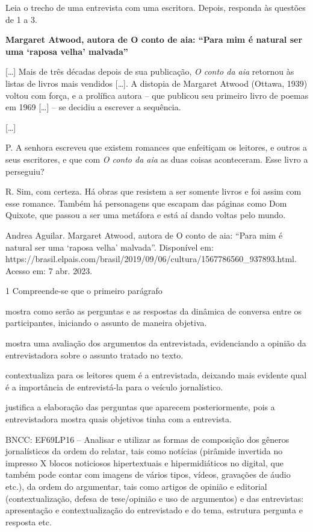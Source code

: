\begin{escolha}
\begin{escolha}
\begin{escolha}
\begin{escolha}
\begin{escolha}
Leia o trecho de uma entrevista com uma escritora. Depois, responda às
questões de 1 a 3.

\textbf{Margaret Atwood, autora de O conto de aia: ``Para mim é natural
ser uma `raposa velha' malvada''}

{[}\ldots{}{]} Mais de três décadas depois de sua publicação, \emph{O
conto da aia} retornou às listas de livros mais vendidos {[}\ldots{}{]}.
A distopia de Margaret Atwood (Ottawa, 1939) voltou com força, e a
prolífica autora -- que publicou seu primeiro livro de poemas em 1969
{[}\ldots{}{]} -- se decidiu a escrever a sequência.

{[}\ldots{}{]}

P. A senhora escreveu que existem romances que enfeitiçam os leitores, e
outros a seus escritores, e que com \emph{O conto da aia} as duas coisas
aconteceram. Esse livro a perseguiu?

R. Sim, com certeza. Há obras que resistem a ser somente livros e foi
assim com esse romance. Também há personagens que escapam das páginas
como Dom Quixote, que passou a ser uma metáfora e está aí dando voltas
pelo mundo.

Andrea Aguilar. Margaret Atwood, autora de O conto de aia: ``Para mim é
natural ser uma `raposa velha' malvada''. Disponível em:
https://brasil.elpais.com/brasil/2019/09/06/cultura/1567786560\_937893.html.
Acesso em: 7 abr. 2023.

\num{1} Compreende-se que o primeiro parágrafo

\begin{escolha}
\item mostra como serão as perguntas e as respostas da dinâmica de
conversa entre os participantes, iniciando o assunto de maneira
objetiva.

\item mostra uma avaliação dos argumentos da entrevistada, evidenciando a
opinião da entrevistadora sobre o assunto tratado no texto.

\item contextualiza para os leitores quem é a entrevistada, deixando mais
evidente qual é a importância de entrevistá-la para o veículo
jornalístico.

\item justifica a elaboração das perguntas que aparecem posteriormente,
pois a entrevistadora mostra quais objetivos tinha com a entrevista.
\end{escolha}

BNCC: EF69LP16 -- Analisar e utilizar as formas de composição dos
gêneros jornalísticos da ordem do relatar, tais como notícias (pirâmide
invertida no impresso X blocos noticiosos hipertextuais e
hipermidiáticos no digital, que também pode contar com imagens de vários
tipos, vídeos, gravações de áudio etc.), da ordem do argumentar, tais
como artigos de opinião e editorial (contextualização, defesa de
tese/opinião e uso de argumentos) e das entrevistas: apresentação e
contextualização do entrevistado e do tema, estrutura pergunta e
resposta etc.


\end{escolha}
\end{escolha}
\end{escolha}
\end{escolha}
\end{escolha}
